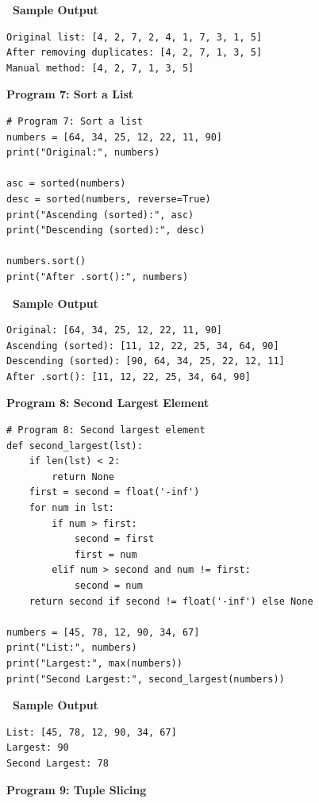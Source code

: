 \documentclass[12pt,a4paper]{article}
\newcommand{\outhead}{\noindent\colorbox{cmrgreen!25}%
  {\textbf{\small\color{cmrdark}~Sample Output~}}\par\vspace{-1pt}}
\begin{document}
\outhead
\begin{lstlisting}[style=outputstyle]
Original list: [4, 2, 7, 2, 4, 1, 7, 3, 1, 5]
After removing duplicates: [4, 2, 7, 1, 3, 5]
Manual method: [4, 2, 7, 1, 3, 5]
\end{lstlisting}

\vspace{0.5cm}

\textbf{Program 7: Sort a List}

\begin{lstlisting}
# Program 7: Sort a list
numbers = [64, 34, 25, 12, 22, 11, 90]
print("Original:", numbers)

asc = sorted(numbers)
desc = sorted(numbers, reverse=True)
print("Ascending (sorted):", asc)
print("Descending (sorted):", desc)

numbers.sort()
print("After .sort():", numbers)
\end{lstlisting}

\outhead
\begin{lstlisting}[style=outputstyle]
Original: [64, 34, 25, 12, 22, 11, 90]
Ascending (sorted): [11, 12, 22, 25, 34, 64, 90]
Descending (sorted): [90, 64, 34, 25, 22, 12, 11]
After .sort(): [11, 12, 22, 25, 34, 64, 90]
\end{lstlisting}

\vspace{0.5cm}

\textbf{Program 8: Second Largest Element}

\begin{lstlisting}
# Program 8: Second largest element
def second_largest(lst):
    if len(lst) < 2:
        return None
    first = second = float('-inf')
    for num in lst:
        if num > first:
            second = first
            first = num
        elif num > second and num != first:
            second = num
    return second if second != float('-inf') else None

numbers = [45, 78, 12, 90, 34, 67]
print("List:", numbers)
print("Largest:", max(numbers))
print("Second Largest:", second_largest(numbers))
\end{lstlisting}

\outhead
\begin{lstlisting}[style=outputstyle]
List: [45, 78, 12, 90, 34, 67]
Largest: 90
Second Largest: 78
\end{lstlisting}

\vspace{0.5cm}

\textbf{Program 9: Tuple Slicing}
\end{document}
